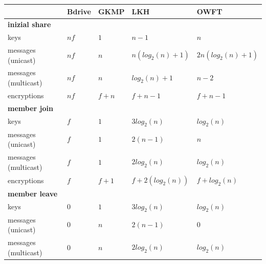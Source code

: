 \begin{table}[!ht]
\centering
\begin{tabular}{l 		| l 						| l 							| l 						| l 						}
 						& \textbf{Bdrive} & \textbf{\ac{GKMP}}\cite{harney1997group} & \textbf{\ac{LKH}}\cite{wallner1999key} & \textbf{\ac{OWFT}}\cite{sherman2003key} \\%
\hline
\textbf{inizial share} 																																		\\
keys 					& $nf$	 					& $1$  							& $n-1$  					& $n$	 					\\%
messages (unicast)		& $nf$	  					& $n$ 							& $n(log_2(n) + 1)$ 		& $2n(log_2(n) + 1)$		\\%
messages (multicast) 	& $nf$	 					& $n$ 							& $log_2(n) + 1$ 			& $n - 2$ 					\\%
encryptions				& $nf$	 					& $f + n$ 						& $f + n -1$				& $f + n -1$				\\%
\hline
\textbf{member join} 																																		\\
keys 					& $f$   					& $1$  							& $3 log_2(n)$				& $log_2(n)$				\\ %
messages (unicast)		& $f$  						& $1$			 				& $2(n - 1)$				& $n$  						\\ %
messages (multicast) 	& $f$ 	 					& $1$ 		 					& $2 log_2(n)$				& $log_2(n)$				\\ %
encryptions				& $f$  						& $f + 1$		 				& $f + 2(log_2(n))$ 		& $f + log_2(n)$			\\ %
\hline
\textbf{member leave}																																		\\
keys 					& $0$						& $1$			  				& $3 log_2(n)$				& $log_2(n)$				\\ %
messages (unicast)		& $0$						& $n$			 				& $2(n - 1)$ 				& $0$	  					\\ %
messages (multicast)	& $0$						& $n$			 				& $2 log_2(n)$				& $log_2(n)$				\\ %

\end{tabular}
\end{table}
